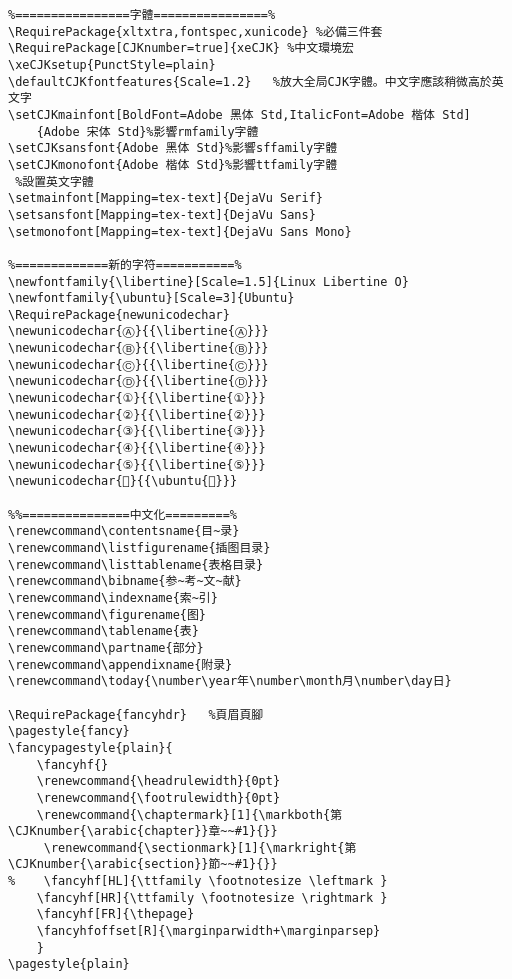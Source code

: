 \begin{verbatim}
%================字體================%
\RequirePackage{xltxtra,fontspec,xunicode} %必備三件套
\RequirePackage[CJKnumber=true]{xeCJK} %中文環境宏
\xeCJKsetup{PunctStyle=plain}
\defaultCJKfontfeatures{Scale=1.2}   %放大全局CJK字體。中文字應該稍微高於英文字
\setCJKmainfont[BoldFont=Adobe 黑体 Std,ItalicFont=Adobe 楷体 Std]
    {Adobe 宋体 Std}%影響rmfamily字體
\setCJKsansfont{Adobe 黑体 Std}%影響sffamily字體
\setCJKmonofont{Adobe 楷体 Std}%影響ttfamily字體
 %設置英文字體
\setmainfont[Mapping=tex-text]{DejaVu Serif} 
\setsansfont[Mapping=tex-text]{DejaVu Sans}
\setmonofont[Mapping=tex-text]{DejaVu Sans Mono}

%=============新的字符===========%
\newfontfamily{\libertine}[Scale=1.5]{Linux Libertine O}
\newfontfamily{\ubuntu}[Scale=3]{Ubuntu}
\RequirePackage{newunicodechar}
\newunicodechar{Ⓐ}{{\libertine{Ⓐ}}}
\newunicodechar{Ⓑ}{{\libertine{Ⓑ}}}
\newunicodechar{Ⓒ}{{\libertine{Ⓒ}}} 
\newunicodechar{Ⓓ}{{\libertine{Ⓓ}}}
\newunicodechar{①}{{\libertine{①}}}
\newunicodechar{②}{{\libertine{②}}}
\newunicodechar{③}{{\libertine{③}}}
\newunicodechar{④}{{\libertine{④}}}
\newunicodechar{⑤}{{\libertine{⑤}}}
\newunicodechar{}{{\ubuntu{}}}

%%===============中文化=========%
\renewcommand\contentsname{目~录}
\renewcommand\listfigurename{插图目录}
\renewcommand\listtablename{表格目录}
\renewcommand\bibname{参~考~文~献}
\renewcommand\indexname{索~引}
\renewcommand\figurename{图}
\renewcommand\tablename{表}
\renewcommand\partname{部分}
\renewcommand\appendixname{附录}
\renewcommand\today{\number\year年\number\month月\number\day日}

\RequirePackage{fancyhdr}   %頁眉頁腳
\pagestyle{fancy}
\fancypagestyle{plain}{
    \fancyhf{}
    \renewcommand{\headrulewidth}{0pt}
    \renewcommand{\footrulewidth}{0pt}
    \renewcommand{\chaptermark}[1]{\markboth{第\CJKnumber{\arabic{chapter}}章~~#1}{}} 
     \renewcommand{\sectionmark}[1]{\markright{第\CJKnumber{\arabic{section}}節~~#1}{}} 
%    \fancyhf[HL]{\ttfamily \footnotesize \leftmark }
    \fancyhf[HR]{\ttfamily \footnotesize \rightmark }
    \fancyhf[FR]{\thepage}
    \fancyhfoffset[R]{\marginparwidth+\marginparsep}
    }
\pagestyle{plain} 


\end{verbatim}
